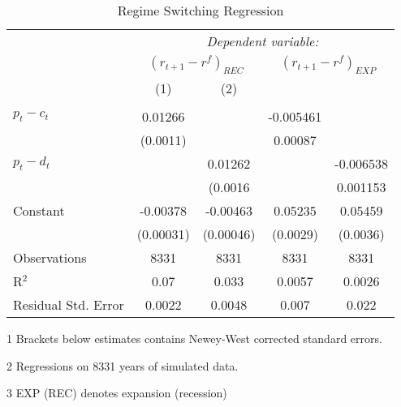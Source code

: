 \begin{table}[H]
\centering   
  \caption{Regime Switching Regression}           
  \label{tab:RSregress}     
  \begin{threeparttable}
\begin{tabular}{@{\hspace{5pt}}l@{\hspace{5pt}}cccc} 
\toprule 
 & \multicolumn{4}{c}{\textit{Dependent variable:}} \\ 
 & \multicolumn{2}{c}{$\left(r_{t+1}-r^f\right)_{REC}$} & \multicolumn{2}{c}{$\left(r_{t+1}-r^f\right)_{EXP}$} \\ 
 \cmidrule(rr){2-5}
 & (1)   &   (2) \\ 
\midrule  
\\[-2.1ex] $ p_t - c_t $ & 0.01266&  &-0.005461   & \\ 
  & (0.0011) & &0.00087 & \\ 
 \addlinespace 
 $p_t - d_t$ &  & 0.01262 & &-0.006538 \\
 & & (0.0016 & &0.001153 \\
 \addlinespace 
 Constant &-0.00378 &-0.00463 &0.05235 &0.05459 \\ 
  &(0.00031) &(0.00046) &(0.0029) &(0.0036) \\ 
 \addlinespace 
\midrule  
Observations & 8331 & 8331 & 8331 &8331\\ 
R$^{2}$ &0.07 & 0.033 & 0.0057 &0.0026\\ 
Residual Std. Error &0.0022 & 0.0048 &0.007 & 0.022  \\ 
\bottomrule 
\end{tabular} 
\begin{tablenotes}
\footnotesize{
\item[1] Brackets below estimates contains Newey-West corrected standard errors. 
\item[2] Regressions on 8331 years of simulated data.
\item[3] EXP (REC) denotes expansion (recession)
}
\end{tablenotes}
\end{threeparttable}
\end{table} 
